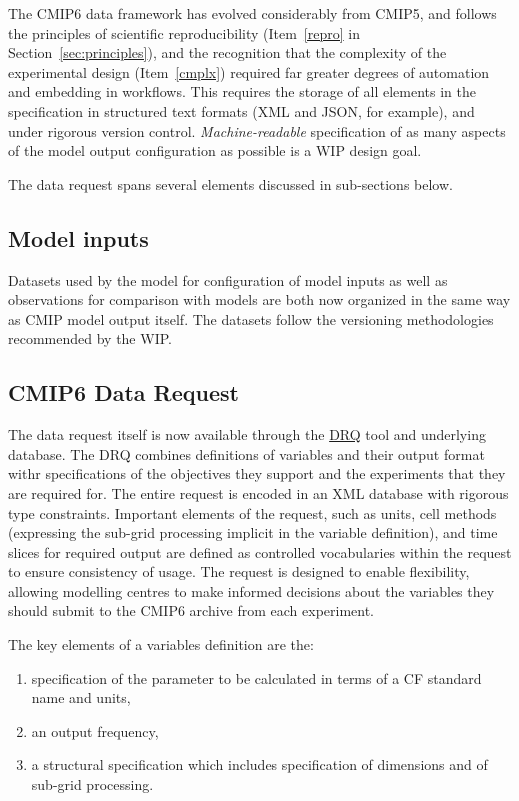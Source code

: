 \documentclass[gmd,manuscript]{copernicus}
\newcommand{\pipref}[1] {\citep{ref:#1}}
\newcommand{\secref}[1] {\mbox{Section  \ref{sec:#1}}}
\begin{document}
The CMIP6 data framework has evolved considerably from CMIP5, and
follows the principles of scientific reproducibility (Item~\ref{repro}
in \secref{principles}), and the recognition that the complexity of
the experimental design (Item~\ref{cmplx}) required far greater
degrees of automation and embedding in workflows. This requires the
storage of all elements in the specification in structured text
formats (XML and JSON, for example), and under rigorous version
control. \emph{Machine-readable} specification of as many aspects of
the model output configuration as possible is a WIP design goal.

The data request spans several elements discussed in sub-sections
below.

\subsection{Model inputs}
\label{sec:data-inputs}

Datasets used by the model for configuration of model inputs
\citep[\texttt{input4MIPs}, see][]{ref:duracketal2017} as well as
observations for comparison with models \citep[\texttt{obs4MIPs},
see][]{ref:teixeiraetal2014} are both now organized in the same way as
CMIP model output itself. The datasets follow the versioning
methodologies recommended by the WIP.

\subsection{CMIP6 Data Request}
\label{sec:data-request}

The data request itself \pipref{juckesetal2015} is now available
through the \href{https://goo.gl/iNBQ9m}{DRQ} tool and underlying
database. The DRQ combines definitions of variables and their output
format withr specifications of the objectives they support and the
experiments that they are required for. The entire request is encoded
in an XML database with rigorous type constraints. Important elements
of the request, such as units, cell methods (expressing the sub-grid
processing implicit in the variable definition), and time slices for
required output are defined as controlled vocabularies within the
request to ensure consistency of usage. The request is designed to
enable flexibility, allowing modelling centres to make informed
decisions about the variables they should submit to the CMIP6 archive
from each experiment.


The key elements of a variables definition are the:
\begin{enumerate}
\item specification of the parameter to be calculated in terms of a CF
  standard name and units,
\item an output frequency,
\item a structural specification which includes specification of
  dimensions and of sub-grid processing.
\end{enumerate}
\end{document}
